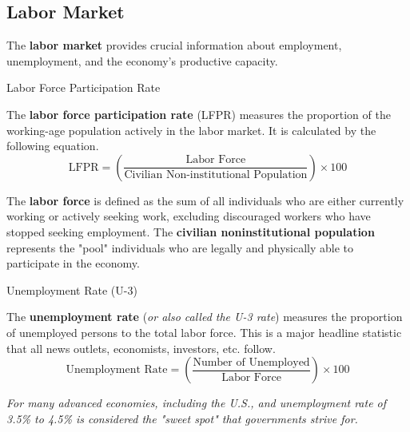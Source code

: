 \documentclass[10pt]{article}
\begin{document}
  \subsection{Labor Market}

    The \textbf{labor market} provides crucial information about employment, unemployment, and the economy's productive capacity.

    \begin{core}[label=core:lfpr]{Labor Force Participation Rate}

      The \textbf{labor force participation rate} (LFPR) measures the proportion of the working-age population actively in the labor market. It is calculated by the following equation. 
      \[
        \text{LFPR} = \left( \frac{\text{Labor Force}}{\text{Civilian Non-institutional Population}} \right) \times 100
      \]

      The \textbf{labor force} is defined as the sum of all individuals who are either currently working or actively seeking work, excluding discouraged workers who have stopped seeking employment. The \textbf{civilian noninstitutional population} represents the "pool" individuals who are legally and physically able to participate in the economy.

    \end{core}

    \begin{core}{Unemployment Rate (U-3)}

      The \textbf{unemployment rate} (\textit{or also called the U-3 rate}) measures the proportion of unemployed persons to the total labor force. This is a major headline statistic that all news outlets, economists, investors, etc. follow.
      \[
        \text{Unemployment Rate} = \left( \frac{\text{Number of Unemployed}}{\text{Labor Force}} \right) \times 100
      \]

      \textit{For many advanced economies, including the U.S., and unemployment rate of 3.5\% to 4.5\% is considered the "sweet spot" that governments strive for.}

    \end{core}
\end{document}
